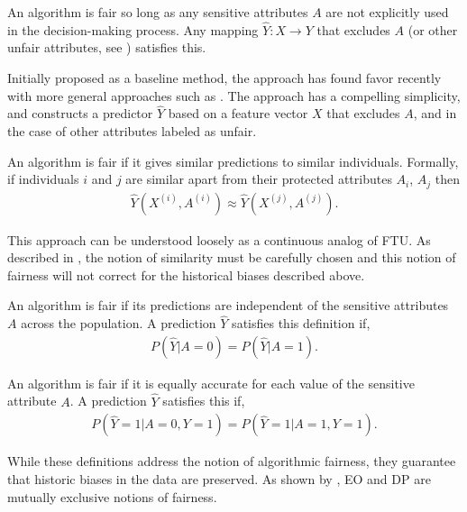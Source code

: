 \begin{define}
  An algorithm is fair so long as any sensitive attributes $A$ are not
  explicitly used in the decision-making process. Any mapping
  $\hat{Y}: X \rightarrow Y$ that excludes $A$ (or other unfair
    attributes, see \citet{grgiccase}) satisfies this.
\end{define}
Initially proposed as a baseline method, the approach has found favor
recently with more general approaches such as \citet{grgiccase}.  The
approach has a compelling simplicity, and constructs a
predictor $\hat Y$ based on a feature vector $X$ that excludes
$A$, and in the case of \citet{grgiccase} other attributes
labeled as unfair.
%
\begin{define}
  An algorithm is fair if it gives similar predictions to similar
  individuals. Formally, if individuals $i$ and $j$ are similar apart
  from their protected attributes $A_i$, $A_j$ then
\begin{align}
  \hat{Y}(X^{(i)}, A^{(i)}) \approx \hat{Y}(X^{(j)}, A^{(j)}).\nonumber
\end{align}
\end{define}
This approach can be understood loosely as a continuous analog of
FTU. As described in \cite{dwork2012fairness}, the
notion of similarity must be carefully chosen and this notion of fairness
will not correct for the historical biases described above.
%
\begin{define}
  An algorithm is fair if its predictions are independent of the
  sensitive attributes $A$ across the population. A prediction
  $\hat{Y}$ satisfies this definition if,
\begin{align}
P(\hat{Y} | A = 0) = P(\hat{Y} | A = 1). \nonumber
\end{align}
\end{define}
%
\begin{define}
An algorithm is fair if it is equally accurate for each value of the sensitive attribute $A$. A prediction $\hat{Y}$ satisfies this if,
\begin{align}
P(\hat{Y}=1 | A=0,Y=1) = P(\hat{Y}=1 | A=1,Y=1). \nonumber
\end{align}
\end{define}
While these definitions address the notion of algorithmic fairness, they guarantee that historic biases in the data are preserved. As shown by \citet{kleinberg2016inherent}, EO and DP are mutually exclusive notions of fairness.

